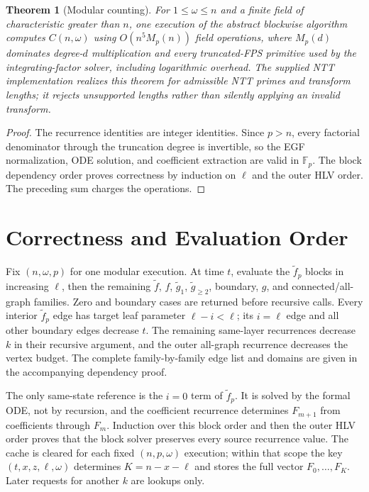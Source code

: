 \documentclass[10pt]{article}
\newtheorem{theorem}{Theorem}
\newcommand{\F}{\mathbb F}
\begin{document}
\begin{theorem}[Modular counting]
For $1\le\omega\le n$ and a finite field of characteristic greater than $n$, one execution of the abstract blockwise algorithm computes $C(n,\omega)$ using $O(n^5M_p(n))$ field operations, where $M_p(d)$ dominates degree-$d$ multiplication and every truncated-FPS primitive used by the integrating-factor solver, including logarithmic overhead. The supplied NTT implementation realizes this theorem for admissible NTT primes and transform lengths; it rejects unsupported lengths rather than silently applying an invalid transform.
\end{theorem}

\begin{proof}
The recurrence identities are integer identities. Since $p>n$, every factorial denominator through the truncation degree is invertible, so the EGF normalization, ODE solution, and coefficient extraction are valid in $\F_p$. The block dependency order proves correctness by induction on $\ell$ and the outer HLV order. The preceding sum charges the operations.
\end{proof}

\section{Correctness and Evaluation Order}
Fix $(n,\omega,p)$ for one modular execution. At time $t$, evaluate the $\widetilde f_p$ blocks in increasing $\ell$, then the remaining $\widetilde f$, $f$, $\widetilde g_1$, $\widetilde g_{\ge2}$, boundary, $g$, and connected/all-graph families. Zero and boundary cases are returned before recursive calls. Every interior $\widetilde f_p$ edge has target leaf parameter $\ell-i<\ell$; its $i=\ell$ edge and all other boundary edges decrease $t$. The remaining same-layer recurrences decrease $k$ in their recursive argument, and the outer all-graph recurrence decreases the vertex budget. The complete family-by-family edge list and domains are given in the accompanying dependency proof.

The only same-state reference is the $i=0$ term of $\widetilde f_p$. It is solved by the formal ODE, not by recursion, and the coefficient recurrence determines $F_{m+1}$ from coefficients through $F_m$. Induction over this block order and then the outer HLV order proves that the block solver preserves every source recurrence value. The cache is cleared for each fixed $(n,p,\omega)$ execution; within that scope the key $(t,x,z,\ell,\omega)$ determines $K=n-x-\ell$ and stores the full vector $F_0,\ldots,F_K$. Later requests for another $k$ are lookups only.
\end{document}
